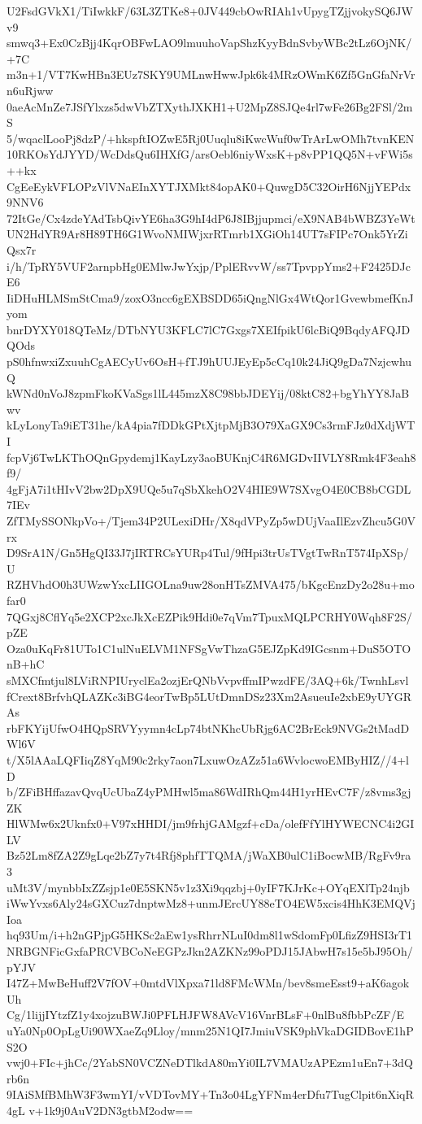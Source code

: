 U2FsdGVkX1/TiIwkkF/63L3ZTKe8+0JV449cbOwRIAh1vUpygTZjjvokySQ6JWv9
smwq3+Ex0CzBjj4KqrOBFwLAO9lmuuhoVapShzKyyBdnSvbyWBc2tLz6OjNK/+7C
m3n+1/VT7KwHBn3EUz7SKY9UMLnwHwwJpk6k4MRzOWmK6Zf5GnGfaNrVrn6uRjww
0aeAcMnZe7JSfYlxzs5dwVbZTXythJXKH1+U2MpZ8SJQe4rl7wFe26Bg2FSl/2mS
5/wqaclLooPj8dzP/+hkspftIOZwE5Rj0Uuqlu8iKwcWuf0wTrArLwOMh7tvnKEN
10RKOsYdJYYD/WcDdsQu6IHXfG/arsOebl6niyWxsK+p8vPP1QQ5N+vFWi5s++kx
CgEeEykVFLOPzVlVNaEInXYTJXMkt84opAK0+QuwgD5C32OirH6NjjYEPdx9NNV6
72ItGe/Cx4zdeYAdTsbQivYE6ha3G9hI4dP6J8IBjjupmci/eX9NAB4bWBZ3YeWt
UN2HdYR9Ar8H89TH6G1WvoNMIWjxrRTmrb1XGiOh14UT7sFIPc7Onk5YrZiQsx7r
i/h/TpRY5VUF2arnpbHg0EMlwJwYxjp/PplERvvW/ss7TpvppYms2+F2425DJcE6
IiDHuHLMSmStCma9/zoxO3ncc6gEXBSDD65iQngNlGx4WtQor1GvewbmefKnJyom
bnrDYXY018QTeMz/DTbNYU3KFLC7lC7Gxgs7XEIfpikU6lcBiQ9BqdyAFQJDQOds
pS0hfnwxiZxuuhCgAECyUv6OsH+fTJ9hUUJEyEp5cCq10k24JiQ9gDa7NzjcwhuQ
kWNd0nVoJ8zpmFkoKVaSgs1lL445mzX8C98bbJDEYij/08ktC82+bgYhYY8JaBwv
kLyLonyTa9iET31he/kA4pia7fDDkGPtXjtpMjB3O79XaGX9Cs3rmFJz0dXdjWTI
fcpVj6TwLKThOQnGpydemj1KayLzy3aoBUKnjC4R6MGDvIIVLY8Rmk4F3eah8f9/
4gFjA7i1tHIvV2bw2DpX9UQe5u7qSbXkehO2V4HIE9W7SXvgO4E0CB8bCGDL7IEv
ZfTMySSONkpVo+/Tjem34P2ULexiDHr/X8qdVPyZp5wDUjVaaIlEzvZhcu5G0Vrx
D9SrA1N/Gn5HgQI33J7jIRTRCsYURp4Tul/9fHpi3trUsTVgtTwRnT574IpXSp/U
RZHVhdO0h3UWzwYxcLIIGOLna9uw28onHTsZMVA475/bKgcEnzDy2o28u+mofar0
7QGxj8CflYq5e2XCP2xcJkXcEZPik9Hdi0e7qVm7TpuxMQLPCRHY0Wqh8F2S/pZE
Oza0uKqFr81UTo1C1ulNuELVM1NFSgVwThzaG5EJZpKd9IGcsnm+DuS5OTOnB+hC
sMXCfmtjul8LViRNPIUryclEa2ozjErQNbVvpvffmIPwzdFE/3AQ+6k/TwnhLsvl
fCrext8BrfvhQLAZKc3iBG4eorTwBp5LUtDmnDSz23Xm2AsueuIe2xbE9yUYGRAs
rbFKYijUfwO4HQpSRVYyymn4cLp74btNKhcUbRjg6AC2BrEck9NVGs2tMadDWl6V
t/X5lAAaLQFIiqZ8YqM90c2rky7aon7LxuwOzAZz51a6WvlocwoEMByHIZ//4+lD
b/ZFiBHffazavQvqUcUbaZ4yPMHwl5ma86WdIRhQm44H1yrHEvC7F/z8vms3gjZK
HlWMw6x2Uknfx0+V97xHHDI/jm9frhjGAMgzf+cDa/olefFfYlHYWECNC4i2GILV
Bz52Lm8fZA2Z9gLqe2bZ7y7t4Rfj8phfTTQMA/jWaXB0ulC1iBocwMB/RgFv9ra3
uMt3V/mynbbIxZZsjp1e0E5SKN5v1z3Xi9qqzbj+0yIF7KJrKc+OYqEXlTp24njb
iWwYvxs6Aly24sGXCuz7dnptwMz8+unmJErcUY88eTO4EW5xcis4HhK3EMQVjIoa
hq93Um/i+h2nGPjpG5HKSc2aEw1ysRhrrNLuI0dm8l1wSdomFp0LfizZ9HSI3rT1
NRBGNFicGxfaPRCVBCoNeEGPzJkn2AZKNz99oPDJ15JAbwH7s15e5bJ95Oh/pYJV
I47Z+MwBeHuff2V7fOV+0mtdVlXpxa71ld8FMcWMn/bev8smeEsst9+aK6agokUh
Cg/1lijjIYtzfZ1y4xojzuBWJi0PFLHJFW8AVcV16VnrBLsF+0nlBu8fbbPcZF/E
uYa0Np0OpLgUi90WXaeZq9Lloy/mnm25N1QI7JmiuVSK9phVkaDGIDBovE1hPS2O
vwj0+FIc+jhCc/2YabSN0VCZNeDTlkdA80mYi0IL7VMAUzAPEzm1uEn7+3dQrb6n
9IAiSMfBMhW3F3wmYI/vVDTovMY+Tn3o04LgYFNm4erDfu7TugClpit6nXiqR4gL
v+1k9j0AuV2DN3gtbM2odw==
